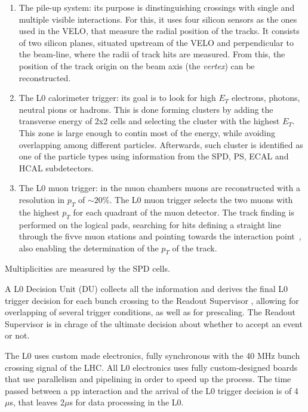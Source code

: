 \begin{enumerate}
\item The pile-up system: its purpose is dinstinguishing crossings with single and multiple visible interactions. For this, it uses four silicon sensors as the ones used in the VELO, that measure the radial position of the tracks.  It consists of two silicon planes, situated upstream of the VELO and perpendicular to the beam-line, where the radii of track hits are measured.  From this, the position of the track origin on the beam axis (the \textit{vertex}) can be reconstructed.  %
\item The L0 calorimeter trigger: its goal is to look for high $E_T$ electrons, photons, neutral pions or hadrons. This is done forming clusters by adding the transverse energy of 2x2 cells and selecting the cluster with the highest $E_T$. This zone is large enough to contin most of the energy, while avoiding overlapping among different particles. Afterwards, such cluster is identified as one of the particle types using information from the SPD, PS, ECAL and HCAL subdetectors. 
\item The L0 muon trigger: in the muon chambers muons are reconstructed with a resolution in $p_T$ of $\sim 20\%$. The L0 muon trigger selects the two muons with the highest $p_T$ for each quadrant of the muon detector. The track finding is performed on the logical pads, searching for hits defining a straight line through the fivve muon stations and pointing towards the interaction point~\cite{Alves:2008zz}, also enabling the determination of the $p_T$ of the track.  %
\end{enumerate}
Multiplicities are measured by the SPD cells.

A L0 Decision Unit (DU) collects all the information and derives the final L0 trigger decision for each bunch crossing to the Readout Supervisor , allowing for overlapping of several trigger conditions, as well as for prescaling. The Readout Supervisor is in chrage of the ultimate decision about whether to accept an event or not. 

The L0 uses custom made electronics, fully synchronous with the 40 MHz bunch crossing signal of the LHC. All L0 electronics uses fully custom-designed boards that use parallelism and pipelining in order to speed up the process. The time passed between a pp interaction and the arrival of the L0 trigger decision is of 4 $\mu$s, that leaves 2$\mu$s for data processing in the L0.

